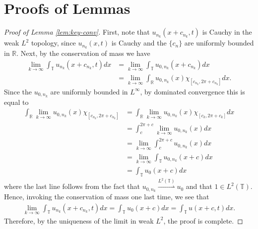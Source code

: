 \documentclass[12pt,reqno]{amsart}
\numberwithin{equation}{section}  %
\newcommand{\rr}{\mathbb{R}}
\newcommand{\ci}{\mathbb{T}}
\begin{document}
\section{Proofs of Lemmas}
%
%
%
\begin{proof}[Proof of Lemma \ref{lem:key-conv}]
First, note that $u_{n_{k}}(x + c_{n_{k}}, t)$
is Cauchy in the weak
$L^{2}$ topology, since  $u_{n_{k}}(x ,t)$ is Cauchy
and the $\{c_{n} \}$ are uniformly bounded in $\rr$. 
Next, by the conservation of mass we have 
%
%
%
%
\begin{equation*}
\begin{split}
  \lim_{k \to \infty} \int_{\ci} u_{n_{k}}(x + c_{n_{k}}, t) dx 
  & = \lim_{k \to \infty} \int_{\ci}
  u_{0,n_{k}}(x + c_{n_{k}}) dx
  \\
  & = \lim_{k \to \infty}\int_{\rr} u_{0,n_{k}}(x) \chi_{[c_{n_{k}}, 2 \pi +
  c_{n_{k}}]} dx.
\end{split}
\end{equation*}
%
%
Since the $u_{0,n_{k}}$ are uniformly bounded in $L^{\infty}$, by dominated
convergence this is equal to
%
%
\begin{equation*}
\begin{split}
  \int_{\rr} \lim_{k \to \infty} u_{0,n_{k}}(x) \chi_{[c_{n_{k}}, 2 \pi + c_{n_{k}}]}
  & = \int_{\rr} \lim_{k \to \infty} u_{0,n_{k}}(x) \chi_{[c_{k}, 2 \pi  +
  c_{k}]} dx
  \\
  & = \int_{c}^{2 \pi + c} \lim_{k \to \infty} u_{0,n_{k}}(x) dx
  \\
  & = \lim_{k \to \infty} \int_{c}^{2 \pi + c}  u_{0,n_{k}}(x) dx
  \\
  & = \lim_{k \to \infty} \int_{\ci} u_{0,n_{k}}(x+c) dx
  \\
  & = \int_{\ci} u_{0}(x +c) dx
\end{split}
\end{equation*}
where the last line follows from the fact that $u_{0,n_{k}}
\overset{L^{2}(\ci)}{\rightharpoonup} u_{0}$ and that $1 \in L^{2}(\ci)$.
Hence, invoking the conservation of mass one last time, we see that
%
%
\begin{equation*}
\begin{split}
  \lim_{k \to \infty} \int_{\ci} u_{n_{k}}(x + c_{n_{k}}, t) dx = \int_{\ci}
  u_{0}(x +c) dx = \int_{\ci} u(x +c, t) dx.
\end{split}
\end{equation*}
%
%
Therefore, by the uniqueness of the limit in weak $L^{2}$, the proof is complete. 
%
%
%
\end{proof}
\end{document}
